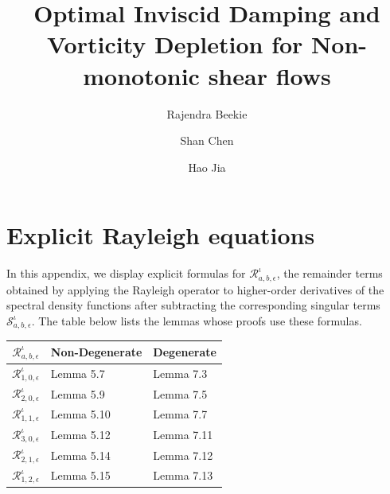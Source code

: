 \documentclass[reqno,11pt]{amsart}
\numberwithin{equation}{section}
\numberwithin{equation}{section} %
\begin{document}
\title{Optimal Inviscid Damping and Vorticity Depletion for Non-monotonic shear flows}


\author{Rajendra Beekie}
\address{Tufts University }

\author{Shan Chen}
\address{University of Minnesota}

\author{Hao Jia}
\address{University of Minnesota}

\maketitle

\appendix
\section{Explicit Rayleigh equations}
In this appendix, we display explicit formulas for $\mathcal{R}_{a,b,\epsilon}^\iota$, the remainder terms obtained by applying the Rayleigh operator to higher-order derivatives of the spectral density functions after subtracting the corresponding singular terms $\mathcal{S}_{a,b,\epsilon}^\iota$. The table below lists the lemmas whose proofs use these formulas.

\begin{center}
\begin{tabular}{||c l  l||} 
 \hline
 $\mathcal{R}_{a,b,\epsilon}^\iota$ & Non-Degenerate & Degenerate\\ [0.5ex] 
 \hline\hline
 $\mathcal{R}_{1,0,\epsilon}^\iota$ & Lemma 5.7 & Lemma 7.3 \\ 
 \hline
 $\mathcal{R}_{2,0,\epsilon}^\iota$ & Lemma 5.9 & Lemma 7.5 \\
 \hline
 $\mathcal{R}_{1,1,\epsilon}^\iota$ & Lemma 5.10 & Lemma 7.7 \\
 \hline
 $\mathcal{R}_{3,0,\epsilon}^\iota$ & Lemma 5.12 & Lemma 7.11 \\
 \hline
 $\mathcal{R}_{2,1,\epsilon}^\iota$ & Lemma 5.14 & Lemma 7.12 \\
 \hline
 $\mathcal{R}_{1,2,\epsilon}^\iota$ & Lemma 5.15 & Lemma 7.13 \\ 
 \hline

\end{tabular}
\end{center}

\end{document}
